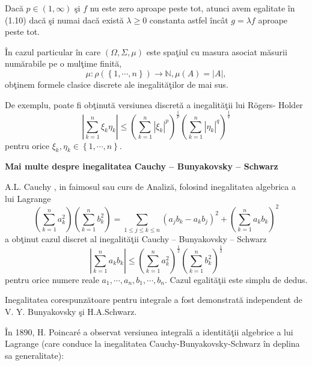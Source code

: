 \documentclass[a4paper,12pt,oneside]{report}
\begin{document}
	Dac\u{a} \(p \in \left ( 1 , \infty  \right )\) \c{s}i \(f\) nu este zero aproape peste tot, atunci avem egalitate \^{i}n (1.10) dac\u{a} \c{s}i numai dac\u{a} exist\u{a}  \(\lambda \geq 0\) constanta astfel \^{i}nc\^{a}t \(g = \lambda f\) aproape peste tot.

	\^{I}n  cazul particular \^{i}n care \(\left ( \Omega , \Sigma, \mu \right )\) este spa\c{t}iul cu masura asociat m\u{a}surii num\u{a}rabile pe o mul\c{t}ime finit\u{a}, \[\mu  : \rho \left ( \left \{ 1,\cdots, n \right \} \right )\rightarrow \mathbb{N}, \mu \left ( A \right ) = \left | A \right |,\]
ob\c{t}inem formele clasice discrete ale inegalit\u{a}\c{t}ilor de mai sus.

De exemplu, poate fi ob\c{t}inut\u{a} versiunea discret\u{a} a inegalit\u{a}\c{t}ii lui R\"{o}gers- Holder
\begin{displaymath}
  \left | \sum_{k=1}^{n} \xi _{k}\eta _{k}\right |\leq \left ( \sum_{k = 1}^{n}\left | \xi _{k}\right |^{p}  \right )^{\frac{1}{p}}\left ( \sum_{k = 1}^{n} \left | \eta _{k} \right |^{q}\right )^{\frac{1}{q}}
\end{displaymath}
pentru  orice \(\xi _{k}, \eta _{k} \in \left \{ 1,\cdots,n \right \}.\)




\textbf{Mai multe despre inegalitatea Cauchy – Bunyakovsky – Schwarz}

A.L. Cauchy , in faimosul sau curs de Analiz\u{a}, folosind inegalitatea algebrica a  lui Lagrange
\begin{displaymath}
  \left ( \sum_{k = 1}^{n} a_{k}^{2}\right )\left ( \sum_{k = 1}^{n} b_{k}^{2}\right ) =  \sum_{1\leq j\leq k\leq n}\left ( a_{j}b_{k} - a_{k}b_{j} \right )^{2} + \left ( \sum_{k = 1}^{n} a_{k}b_{k}\right )^{2}
\end{displaymath}
a ob\c{t}inut cazul discret al inegalit\u{a}\c{t}ii Cauchy – Bunyakovsky – Schwarz
\begin{displaymath}
  \left | \sum_{k = 1}^{n} a_{k}b_{k} \right |\leq \left ( \sum_{k = 1}^{n}a_{k}^{2} \right )^{\frac{1}{2}}\left ( \sum_{k = 1}^{n}b_{k}^{2} \right )^{\frac{1}{2}}
\end{displaymath}
pentru orice numere reale \(a_{1},\cdots,a_{n}, b_{1},\cdots, b_{n}\). Cazul egalit\u{a}\c{t}ii este simplu de dedus.

Inegalitatea corespunz\u{a}toare pentru integrale a fost demonstrat\u{a} independent de V. Y. Bunyakovsky \c{s}i H.A.Schwarz.

	\^{I}n 1890, H. Poincar\'{e} a observat versiunea integral\u{a} a identit\u{a}\c{t}ii algebrice a lui Lagrange (care conduce la inegalitatea Cauchy-Bunyakovsky-Schwarz \^{i}n deplina sa generalitate):
\end{document}
